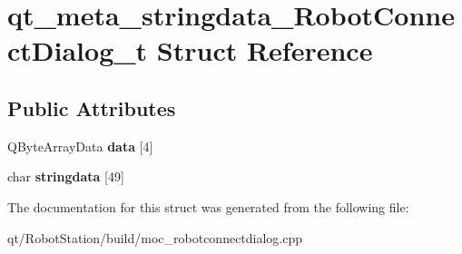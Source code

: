 \hypertarget{structqt__meta__stringdata__RobotConnectDialog__t}{}\section{qt\+\_\+meta\+\_\+stringdata\+\_\+\+Robot\+Connect\+Dialog\+\_\+t Struct Reference}
\label{structqt__meta__stringdata__RobotConnectDialog__t}
\subsection*{Public Attributes}
\begin{DoxyCompactItemize}
\item 
\hypertarget{structqt__meta__stringdata__RobotConnectDialog__t_a87ce239f42b984840ce8b74c6be33db3}{}Q\+Byte\+Array\+Data {\bfseries data} \mbox{[}4\mbox{]}\label{structqt__meta__stringdata__RobotConnectDialog__t_a87ce239f42b984840ce8b74c6be33db3}

\item 
\hypertarget{structqt__meta__stringdata__RobotConnectDialog__t_aa29f6444f74057e7dda8589d6a676fe4}{}char {\bfseries stringdata} \mbox{[}49\mbox{]}\label{structqt__meta__stringdata__RobotConnectDialog__t_aa29f6444f74057e7dda8589d6a676fe4}

\end{DoxyCompactItemize}


The documentation for this struct was generated from the following file\+:\begin{DoxyCompactItemize}
\item 
qt/\+Robot\+Station/build/moc\+\_\+robotconnectdialog.\+cpp\end{DoxyCompactItemize}
